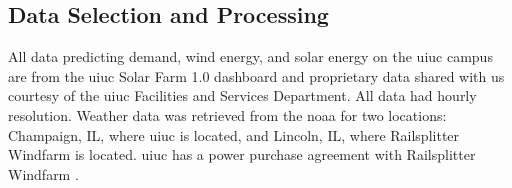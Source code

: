 \subsection{Data Selection and Processing}

All data predicting demand, wind energy, and solar energy on the \gls{uiuc}
campus are from the \gls{uiuc} Solar Farm 1.0 dashboard
\cite{alsoenergy_university_2019} and proprietary data shared with us courtesy
of the \gls{uiuc} Facilities and Services Department. All data had hourly
resolution. Weather data was retrieved from the
\gls{noaa}\cite{national_center_for_environmental_information_find_nodate} for
two locations: Champaign, IL, where \gls{uiuc} is located, and Lincoln, IL,
where Railsplitter Windfarm is located. \gls{uiuc} has a power purchase
agreement with Railsplitter Windfarm \cite{breitweiser_wind_2016}.

